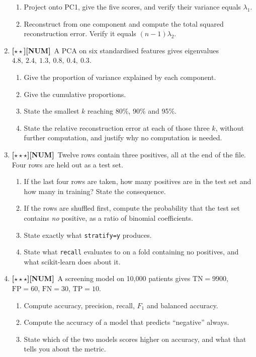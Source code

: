 \documentclass[11pt,a4paper]{article}
\newcommand{\LA}{{\footnotesize\textbf{[$\star\star\star$]}}}
\newcommand{\LB}{{\footnotesize\textbf{[$\star\star$]}}}
\newcommand{\NUM}{{\footnotesize\textbf{[NUM]}}}
\newcommand{\Q}[1]{\item[\textbf{#1}]}
\begin{document}
\begin{enumerate}[leftmargin=2.2cm]
\begin{enumerate}[label=(\alph*)]
    \item Project onto PC1, give the five scores, and verify their variance
      equals $\lambda_1$.
    \item Reconstruct from one component and compute the total squared
      reconstruction error. Verify it equals $(n-1)\lambda_2$.
  \end{enumerate}
\Q{U4.69}\LB\NUM\ A PCA on six standardised features gives eigenvalues
  $4.8,\ 2.4,\ 1.3,\ 0.8,\ 0.4,\ 0.3$.
  \begin{enumerate}[label=(\alph*)]
    \item Give the proportion of variance explained by each component.
    \item Give the cumulative proportions.
    \item State the smallest $k$ reaching 80\%, 90\% and 95\%.
    \item State the relative reconstruction error at each of those three $k$,
      without further computation, and justify why no computation is needed.
  \end{enumerate}
\Q{U4.70}\LA\NUM\ Twelve rows contain three positives, all at the end of the
  file. Four rows are held out as a test set.
  \begin{enumerate}[label=(\alph*)]
    \item If the last four rows are taken, how many positives are in the test
      set and how many in training? State the consequence.
    \item If the rows are shuffled first, compute the probability that the test
      set contains \emph{no} positive, as a ratio of binomial coefficients.
    \item State exactly what \texttt{stratify=y} produces.
    \item State what \texttt{recall} evaluates to on a fold containing no
      positives, and what scikit-learn does about it.
  \end{enumerate}
\Q{U4.71}\LA\NUM\ A screening model on 10{,}000 patients gives
  $\text{TN} = 9900$, $\text{FP} = 60$, $\text{FN} = 30$, $\text{TP} = 10$.
  \begin{enumerate}[label=(\alph*)]
    \item Compute accuracy, precision, recall, $F_1$ and balanced accuracy.
    \item Compute the accuracy of a model that predicts ``negative'' always.
    \item State which of the two models scores higher on accuracy, and what
      that tells you about the metric.

\end{enumerate}
\end{enumerate}
\end{document}
